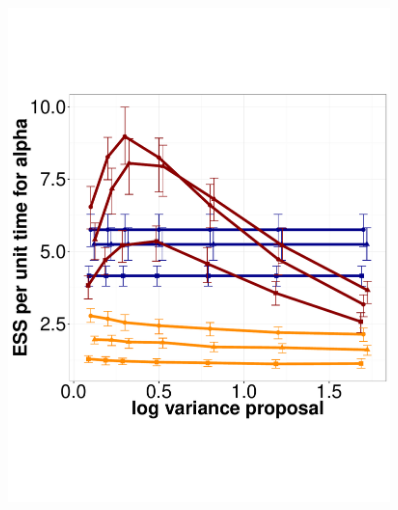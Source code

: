   \begin{figure}%
  \centering
  \begin{minipage}[hp]{0.45\linewidth}
  \centering
    \includegraphics [width=0.90\textwidth, angle=0]{figs/q_3_alpha.pdf}
      \end{minipage}
  \begin{minipage}[hp]{0.45\linewidth}
  \centering

\end{minipage}
\end{figure}
